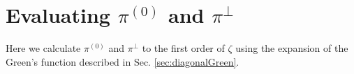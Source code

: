 %
%
%
%
%
%
%
%
%




\section{Evaluating $\pi^{(0)}$ and $\pi^{\perp}$\label{sec:calculatePi}}
Here we  calculate $\pi^{(0)}$ and $\pi^{\perp}$ to the first order of $\zeta$ using the expansion of the Green's function described in Sec. \ref{sec:diagonalGreen}.

